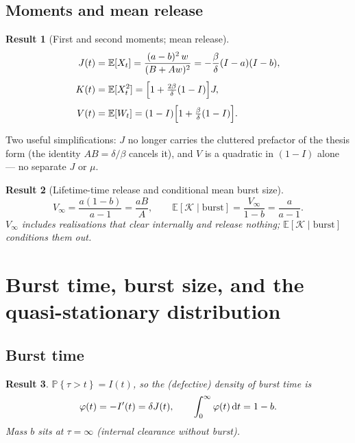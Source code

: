 \documentclass[11pt,a4paper]{article}
\newcommand{\dd}{{\rm d}}
\newcommand{\E}{\mathbb{E}}
\newcommand{\Prob}[1]{\mathbb{P}\!\left\{#1\right\}}
\newcommand{\xt}{X_t}
\newcommand{\wt}{W_t}
\newcommand{\Kb}{\mathcal{K}}
\newcommand{\Aa}{A}
\newcommand{\Bb}{B}
\theoremstyle{plain}
\newtheorem{result}{Result}[section]
\theoremstyle{definition}
\theoremstyle{remark}
\begin{document}
\subsection{Moments and mean release}

\begin{result}[First and second moments; mean release]
\begin{align}
J(t)&=\E[\xt]=\frac{(a-b)^2\,w}{(\Bb+\Aa w)^2}
=-\frac{\beta}{\delta}(I-a)(I-b),\\[0.3em]
K(t)&=\E[\xt^2]=\Bigl[1+\tfrac{2\beta}{\delta}(1-I)\Bigr]J,\\[0.3em]
V(t)&=\E[\wt]=(1-I)\Bigl[1+\tfrac{\beta}{\delta}(1-I)\Bigr].
\end{align}
\end{result}
Two useful simplifications: $J$ no longer carries the cluttered prefactor of the
thesis form (the identity $\Aa\Bb=\delta/\beta$ cancels it), and $V$ is a
quadratic in $(1-I)$ alone --- no separate $J$ or $\mu$.

\begin{result}[Lifetime-time release and conditional mean burst size]
\begin{equation}
V_\infty=\frac{a(1-b)}{a-1}=\frac{a\Bb}{\Aa},\qquad
\E[\Kb\mid\text{burst}]=\frac{V_\infty}{1-b}=\frac{a}{a-1}.
\end{equation}
$V_\infty$ includes realisations that clear internally and release nothing;
$\E[\Kb\mid\text{burst}]$ conditions them out.
\end{result}

\section{Burst time, burst size, and the quasi-stationary distribution}

\subsection{Burst time}

\begin{result}
$\Prob{\tau>t}=I(t)$, so the (defective) density of burst time is
\[
\varphi(t)=-I'(t)=\delta J(t),\qquad \int_0^\infty\varphi(t)\,\dd t=1-b.
\]
Mass $b$ sits at $\tau=\infty$ (internal clearance without burst).
\end{result}
\end{document}
